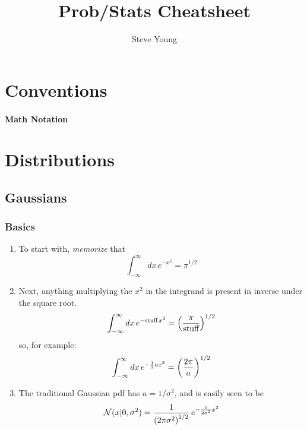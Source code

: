 \documentclass[11pt]{article}
\title{Prob/Stats Cheatsheet}
\author{Steve Young}
\begin{document}
\maketitle

\section{Conventions}
\paragraph{Math Notation}



\section{Distributions}
\subsection{Gaussians}
\subsubsection{Basics}
\begin{enumerate}
  \item To start with, \emph{memorize} that
  \begin{equation}
    \boxed{\int_{-\infty}^{\infty} dx\, e^{-x^2} = \pi^{1/2}}
  \end{equation}

  \item Next, anything multiplying the $x^2$ in the integrand is present in inverse
  under the square root.
  \begin{equation}
    \int_{-\infty}^{\infty} dx\, e^{-\textrm{stuff}\, x^2} =
    \left( \frac{\pi}{\textrm{stuff}} \right)^{1/2}
  \end{equation}
  so, for example:
  \begin{equation}
    \label{eq:int_gauss_a2}
    \int_{-\infty}^{\infty} dx\, e^{-\frac{1}{2} a x^2} = \left( \frac{2 \pi}{a} \right)^{1/2} 
  \end{equation}

  \item The traditional Gaussian pdf has $a = 1 / \sigma^2$, and is easily seen to be
  \begin{equation}
    \mathcal{N}(x|0,\sigma^2) = \frac{1}{\left( 2 \pi \sigma^2 \right)^{1/2}}\,
    e^{-\frac{1}{2 \sigma^2} x^2}
  \end{equation}
\end{enumerate}
\end{document}
